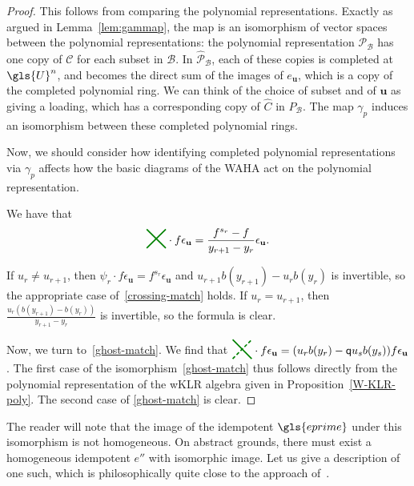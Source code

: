 \documentclass[10pt]{article}
\theoremstyle{definition}
\newcommand{\pq}{\mathsf{q}}
\newcommand{\Bu}{\mathbf{u}}
\newcommand{\cP}{\mathcal{P}}
\begin{document}
\begin{proof}
 This follows from comparing the polynomial representations. Exactly
 as argued in Lemma~\ref{lem:gammap}, the map is an isomorphism of
 vector spaces between the polynomial representations: the polynomial
 representation ${\cP}_{\mathscr{B}}$ has one copy of $\mathcal{C}$
 for each subset in $\mathscr{B}$. In $\widehat{\cP}_{\mathscr{B}}$,
 each of these copies is completed at $\gls{U}^n$, and becomes the direct
 sum of the images of $e_{\Bu}$, which is a copy of the completed
 polynomial ring. We can think of the choice of subset and of $\Bu$
 as giving a loading, which has a corresponding copy of $\widehat{C}$
 in $P_{\mathscr{B}}$. The map $\gamma_p$ induces an isomorphism
 between these completed polynomial rings.

 Now, we should
 consider how identifying completed polynomial representations via
 $\gamma_p$ affects how the basic diagrams of the WAHA act on the polynomial
 representation. 

 We have that \[\tikz[baseline,very thick,scale=1.5, green!50!black]{\draw (.2,.3) --
 (-.2,-.1); \draw
 (.2,-.1) -- (-.2,.3);} \cdot
f\epsilon_{\Bu}=\frac{f^{s_r}-f}{y_{r+1}-y_r}\epsilon_{\Bu}.
\]

If $u_r\neq u_{r+1}$, then $\psi_r\cdot
f\epsilon_\Bu=f^{s_r}\epsilon_\Bu$ and $u_{r+1}b(y_{r+1})-u_rb(y_r)$
is invertible, so the appropriate case of~\eqref{crossing-match} holds. If $u_r= u_{r+1}$, then
$\frac{u_{r}(b(y_{r+1})-b(y_r))}{y_{r+1}-y_r}$ is invertible, so the
formula is clear. 

Now, we turn to~\eqref{ghost-match}. We find that $\tikz[baseline,very thick,scale=1.5, green!50!black]{\draw[densely dashed] 
 (-.2,-.1)-- (.2,.3); \draw
 (.2,-.1) -- (-.2,.3);}\cdot f\epsilon_{\Bu}=(u_rb(y_r)-\pq u_sb(y_s) )f\epsilon_{\Bu}$. The first case of the isomorphism~\eqref{ghost-match} thus
follows directly from the polynomial representation of the wKLR algebra
given in Proposition~\ref{W-KLR-poly}. The second case of
\eqref{ghost-match} is clear.
\end{proof}





 The reader will note that the image of the idempotent $\gls{eprime}$ under
 this isomorphism is not homogeneous. On abstract grounds, there
 must exist a homogeneous idempotent $e''$ with isomorphic image. Let
 us give a description of one such, which is philosophically quite
 close to the approach of~\cite{SWschur}. 
\end{document}
